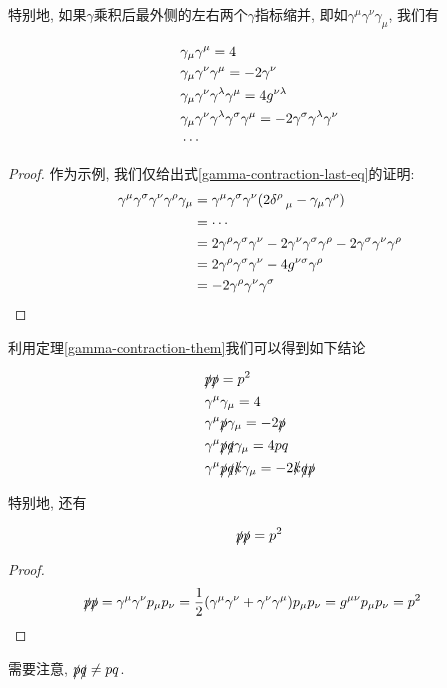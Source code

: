 特别地, 如果$\gamma$乘积后最外侧的左右两个$\gamma$指标缩并, 即如$\gamma^\mu\gamma^\nu\gamma_\mu$, 我们有
\begin{theorem}\label{gamma-contraction-them}
    \begin{align}
        &\gamma_\mu\gamma^\mu=4\\
        &\gamma_\mu\gamma^\nu\gamma^\mu=-2\gamma^\nu\\
        &\gamma_\mu\gamma^\nu\gamma^\lambda\gamma^\mu=4g^{\nu\lambda}\\
        &\gamma_\mu\gamma^{\nu}\gamma^\lambda\gamma^\sigma\gamma^\mu=-2\gamma^\sigma\gamma^\lambda\gamma^\nu\label{gamma-contraction-last-eq}\\
        &\cdots\notag
    \end{align}
\end{theorem}
\begin{proof}
    作为示例, 我们仅给出式\eqref{gamma-contraction-last-eq}的证明:
    \begin{align}
        \gamma^\mu\gamma^\sigma\gamma^\nu\gamma^\rho\gamma_\mu&=\gamma^\mu\gamma^\sigma\gamma^\nu(2\delta^\rho_{~~\mu}-\gamma_\mu\gamma^\rho)\\
        &=\cdots\notag\\
        &=2\gamma^\rho\gamma^\sigma\gamma^\nu-2\gamma^\nu\gamma^\sigma\gamma^\rho-2\gamma^\sigma\gamma^\nu\gamma^\rho\\
        &=2\gamma^\rho\gamma^\sigma\gamma^\nu-4g^{\nu\sigma}\gamma^\rho\\
        &=-2\gamma^\rho\gamma^\nu\gamma^\sigma
    \end{align}
\end{proof}

利用定理\ref{gamma-contraction-them}我们可以得到如下结论
\begin{theorem}
    \begin{align}
        &\slashed p\slashed p=p^2\\
        &\gamma^\mu\gamma_\mu=4\\
        &\gamma^\mu\slashed p\gamma_\mu=-2\slashed p\\
        &\gamma^\mu\slashed p\slashed q\gamma_\mu=4pq\\
        &\gamma^\mu\slashed p\slashed q\slashed k\gamma_\mu=-2\slashed k\slashed q\slashed p
    \end{align}
\end{theorem}

特别地, 还有
\begin{theorem}
    \begin{equation}
        \slashed p\slashed p=p^2
    \end{equation}
\end{theorem}
\begin{proof}
    \begin{align}
        \slashed p\slashed p&=\gamma^\mu\gamma^\nu p_{\mu}p_\nu=\frac12(\gamma^\mu\gamma^\nu+\gamma^\nu\gamma^\mu)p_\mu p_\nu=g^{\mu\nu}p_{\mu}p_{\nu}=p^2
    \end{align}
\end{proof}
需要注意, $\slashed p\slashed q\neq pq$.

